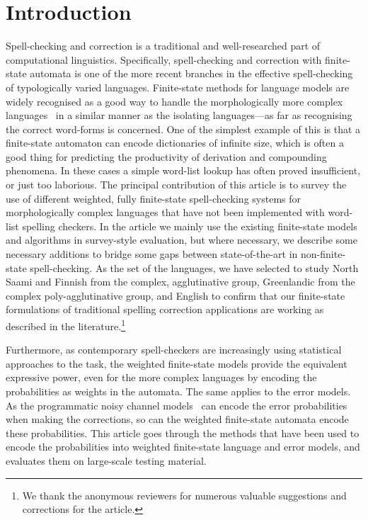 \documentclass[a4paper,12pt]{article}
\begin{document}
\makeatletter\let\chapter\@undefined\makeatother
\listoftodos

\section{Introduction} 

Spell-checking and correction is a traditional and well-researched part of
computational linguistics. Specifically, spell-checking and correction with
finite-state automata is one of the more recent branches in the effective
spell-checking of typologically varied languages. Finite-state methods for
language models are widely recognised as a good way to handle the
morphologically more complex languages~\cite[]{beesley2003finite} in a similar
manner as the isolating languages---as far as recognising the correct
word-forms is concerned. One of the simplest example of this is that a
finite-state automaton can encode dictionaries of infinite size, which is often
a good thing for predicting the productivity of derivation and compounding
phenomena.  In these cases a simple word-list lookup has often proved
insufficient, or just too laborious. The principal contribution of this article
is to survey the use of different weighted, fully finite-state spell-checking
systems for morphologically complex languages that have not been implemented
with word-list spelling checkers.  In the article we mainly use the existing
finite-state models and algorithms in survey-style evaluation, but where
necessary, we describe some necessary additions to bridge some gaps between
state-of-the-art in non-finite-state spell-checking.  As the set of the
languages, we have selected to study North Saami and Finnish from the complex,
agglutinative group, Greenlandic from the complex poly-agglutinative group, and
English to confirm that our finite-state formulations of traditional spelling
correction applications are working as described in the literature.\footnote{We thank the anonymous reviewers for numerous valuable suggestions and corrections
for the article.}

Furthermore, as contemporary spell-checkers are increasingly using statistical
approaches to the task, the weighted finite-state models provide the equivalent
expressive power, even for the more complex languages by encoding the
probabilities as weights in the automata.  The same applies to the error
models. As the programmatic noisy channel models~\cite[]{brill2000improved} can
encode the error probabilities when making the corrections, so can the weighted
finite-state automata encode these probabilities. This article goes through the
methods that have been used to encode the probabilities into weighted
finite-state language and error models, and evaluates them on large-scale
testing material.
\end{document}
